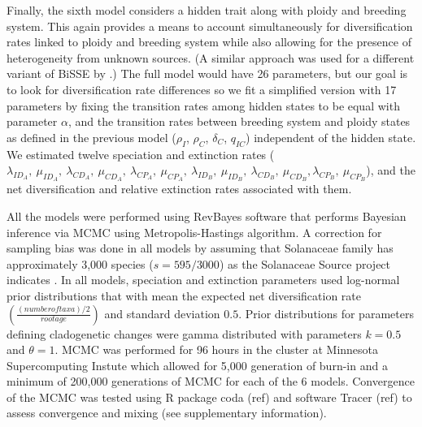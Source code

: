 Finally, the sixth model considers a hidden trait along with ploidy and breeding system.
This again provides a means to account simultaneously for diversification rates linked to ploidy and breeding system while also allowing for the presence of heterogeneity from unknown sources.
(A similar approach was used for a different variant of BiSSE by \citealt{huang_2018,caetano_2018}.)
The full model would have 26 parameters, but our goal is to look for diversification rate differences so we fit a simplified version with 17 parameters by fixing the transition rates among hidden states to be equal with parameter $\alpha$, and the transition rates between breeding system and ploidy states as defined in the previous model ($\rho_I$, $\rho_C$, $\delta_C$,  $q_{IC}$) independent of the hidden state.
We estimated twelve speciation and extinction rates ($\lambda_{ID_A},\ \mu_{ID_A},\ \lambda_{CD_A},\ \mu_{CD_A},\ \lambda_{CP_A},\ \mu_{CP_A},\ \lambda_{ID_B},\ \mu_{ID_B},\ \lambda_{CD_B},\ \mu_{CD_B}, \lambda_{CP_B},\ \mu_{CP_B}$), and the net diversification and relative extinction rates associated with them.

All the models were performed using RevBayes \citep{hoehna_2016} software that performs Bayesian inference via MCMC using Metropolis-Hastings algorithm.
A correction for sampling bias was done in all models by assuming that Solanaceae family has approximately 3,000 species ($s=595/3000$) as the Solanaceae Source project indicates \citep{solsource}.
In all models, speciation and extinction parameters used log-normal prior distributions that with mean the expected net diversification rate $ ( \frac{(number of taxa)/2}{root age})$ and standard deviation $0.5$.
Prior distributions for parameters defining cladogenetic changes were gamma distributed with parameters $k=0.5$ and $\theta=1$. 
MCMC was performed for 96 hours in the cluster at Minnesota Supercomputing Instute which allowed for 5,000 generation of burn-in and a minimum of 200,000 generations of MCMC for each of the 6 models.
Convergence of the MCMC was tested using R package coda (ref) and software Tracer (ref) to assess convergence and mixing (see supplementary information).


